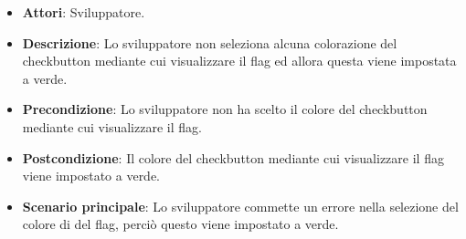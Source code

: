 
\FloatBarrier
\begin{itemize}
\item\textbf{Attori}: Sviluppatore.
\item\textbf{Descrizione}: Lo sviluppatore non seleziona alcuna colorazione del checkbutton mediante cui visualizzare il flag ed allora questa viene impostata a verde.
\item\textbf{Precondizione}: Lo sviluppatore non ha scelto il colore del checkbutton mediante cui visualizzare il flag.
\item\textbf{Postcondizione}: Il colore del checkbutton mediante cui visualizzare il flag viene impostato a verde.
\item\textbf{Scenario principale}: Lo sviluppatore commette un errore nella selezione del colore di del flag, perciò questo viene impostato a verde. 
\end{itemize}
